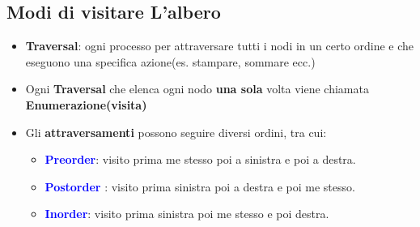 \newpage
\subsection{Modi di visitare L'albero}
\begin{itemize}
    \item \textbf{Traversal}: ogni processo per attraversare tutti i nodi in un certo ordine e che eseguono una specifica azione(es. stampare, sommare ecc.)
    \item Ogni \textbf{Traversal} che elenca ogni nodo \textbf{una sola} volta viene chiamata \textbf{Enumerazione(visita)}
    \item Gli \textbf{attraversamenti} possono seguire diversi ordini, tra cui:
    \begin{itemize}
        \item \textbf{\textcolor{blue}{Preorder}}: visito prima me stesso poi a sinistra e poi a destra.
        
        \item \textbf{\textcolor{blue}{Postorder}} : visito prima sinistra poi a destra e poi me stesso.
        
        \item \textbf{\textcolor{blue}{Inorder}}: visito prima sinistra poi me stesso e poi destra.
    \end{itemize}
    
\end{itemize} 
